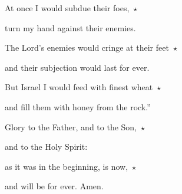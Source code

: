 \noindent At once I would subdue their foes,~$\star$~\nopagebreak

turn my hand against their enemies.

\noindent The Lord’s enemies would cringe at their feet~$\star$~\nopagebreak

and their subjection would last for ever.

\noindent But Israel I would feed with finest wheat~$\star$~\nopagebreak

and fill them with honey from the rock.”

\noindent Glory to the Father, and to the Son,~$\star$~\nopagebreak

and to the Holy Spirit:

\noindent as it was in the beginning, is now,~$\star$~\nopagebreak

and will be for ever. Amen.
